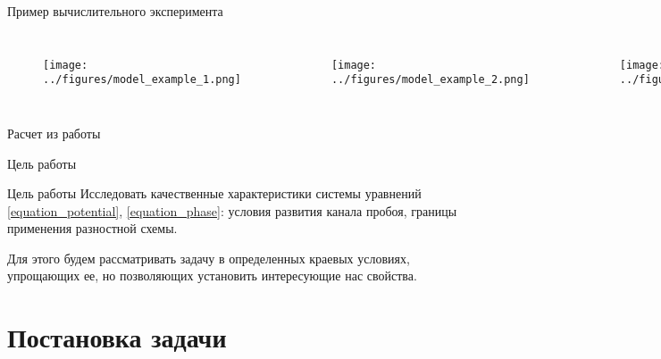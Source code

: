 \documentclass{beamer}
\begin{document}
\begin{frame}{Пример вычислительного эксперимента}
\begin{columns}
\begin{figure}
	\texttt{[image: ../figures/model\_example\_1.png]}
\end{figure}
\begin{figure}
	\texttt{[image: ../figures/model\_example\_2.png]}
\end{figure}
\begin{figure}
	\texttt{[image: ../figures/model\_example\_3.png]}
\end{figure}
\end{columns}
\begin{center}
	Расчет из работы \cite{experiment_2d}
\end{center}
\end{frame}


\begin{frame}{Цель работы}
\begin{block}{Цель работы}
	Исследовать качественные характеристики системы уравнений \eqref{equation_potential},
	\eqref{equation_phase}: условия развития канала пробоя, границы применения разностной
	схемы.
\end{block}
Для этого будем рассматривать задачу в определенных краевых условиях, упрощающих ее, но
позволяющих установить интересующие нас свойства.
\end{frame}


\section{Постановка задачи}
\end{document}
